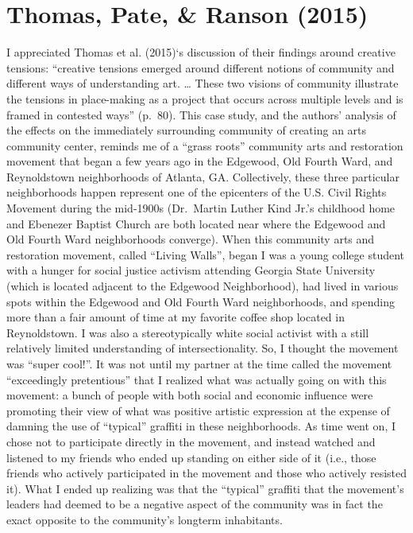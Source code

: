 \documentclass[11pt,]{tufte-handout}
\begin{document}
\section{Thomas, Pate, \& Ranson (2015)}\label{thomas2015crosstown}

I appreciated Thomas et al. (2015)`s discussion of their findings around
creative tensions: ``creative tensions emerged around different notions
of community and different ways of understanding art. \ldots{} These two
visions of community illustrate the tensions in place-making as a
project that occurs across multiple levels and is framed in contested
ways'' (p.~80). This case study, and the authors' analysis of the
effects on the immediately surrounding community of creating an arts
community center, reminds me of a ``grass roots'' community arts and
restoration movement that began a few years ago in the Edgewood, Old
Fourth Ward, and Reynoldstown neighborhoods of Atlanta, GA.
Collectively, these three particular neighborhoods happen represent one
of the epicenters of the U.S. Civil Rights Movement during the mid-1900s
(Dr.~Martin Luther Kind Jr.'s childhood home and Ebenezer Baptist Church
are both located near where the Edgewood and Old Fourth Ward
neighborhoods converge). When this community arts and restoration
movement, called ``Living Walls'', began I was a young college student
with a hunger for social justice activism attending Georgia State
University (which is located adjacent to the Edgewood Neighborhood), had
lived in various spots within the Edgewood and Old Fourth Ward
neighborhoods, and spending more than a fair amount of time at my
favorite coffee shop located in Reynoldstown. I was also a
stereotypically white social activist with a still relatively limited
understanding of intersectionality. So, I thought the movement was
``super cool!''. It was not until my partner at the time called the
movement ``exceedingly pretentious'' that I realized what was actually
going on with this movement: a bunch of people with both social and
economic influence were promoting their view of what was positive
artistic expression at the expense of damning the use of ``typical''
graffiti in these neighborhoods. As time went on, I chose not to
participate directly in the movement, and instead watched and listened
to my friends who ended up standing on either side of it (i.e., those
friends who actively participated in the movement and those who actively
resisted it). What I ended up realizing was that the ``typical''
graffiti that the movement's leaders had deemed to be a negative aspect
of the community was in fact the exact opposite to the community's
longterm inhabitants.
\end{document}
